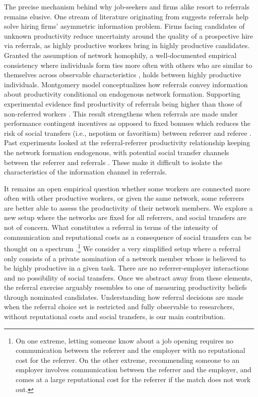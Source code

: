 \documentclass[11pt,a4paper,oneside]{article}
\begin{document}
The precise mechanism behind why job-seekers and firms alike resort to referrals remains elusive. One stream of literature originating from \citet{montgomery_social_1991} suggests referrals help solve hiring firms' asymmetric information problem. Firms facing candidates of unknown productivity reduce uncertainty around the quality of a prospective hire via referrals, as highly productive workers bring in highly productive candidates. Granted the assumption of network homophily, a well-documented empirical consistency where individuals form ties more often with others who are similar to themselves across observable characteristics \citep{mcpherson2001birds,mcpherson2006social}, holds between highly productive individuals. Montgomery model conceptualizes how referrals convey information about productivity conditional on endogenous network formation. Supporting experimental evidence find productivity of referrals being higher than those of non-referred workers \citep{beaman_who_2012,pallais_why_2016}. This result strengthens when referrals are made under performance contingent incentives as opposed to fixed bonuses which reduces the risk of social transfers (i.e., nepotism or favoritism) between referrer and referee \citep{beaman_who_2012,beaman_job_2018}. Past experiments looked at the referral-referrer productivity relationship keeping the network formation endogenous, with potential social transfer channels between the referrer and referrals \citep{beaman_who_2012,beaman_job_2018,pallais_why_2016,witte2021workers}. These make it difficult to isolate the characteristics of the information channel in referrals.

It remains an open empirical question whether some workers are connected more often with other productive workers, or given the same network, some referrers are better able to assess the productivity of their network members. We explore a new setup where the networks are fixed for all referrers, and social transfers are not of concern. What constitutes a referral in terms of the intensity of communication and reputational costs as a consequence of social transfers can be thought on a spectrum \citep{topa2019social}.\footnote{On one extreme, letting someone know about a job opening requires no communication between the referrer and the employer with no reputational cost for the referrer. On the other extreme, recommending someone to an employer involves communication between the referrer and the employer, and comes at a large reputational cost for the referrer if the match does not work out.} We consider a very simplified setup where a referral only consists of a private nomination of a network member whose is believed to be highly productive in a given task. There are no referrer-employer interactions and no possibility of social transfers. Once we abstract away from these elements, the referral exercise arguably resembles to one of measuring productivity beliefs through nominated candidates. Understanding how referral decisions are made when the referral choice set is restricted and fully observable to researchers, without reputational costs and social transfers, is our main contribution.
\end{document}

